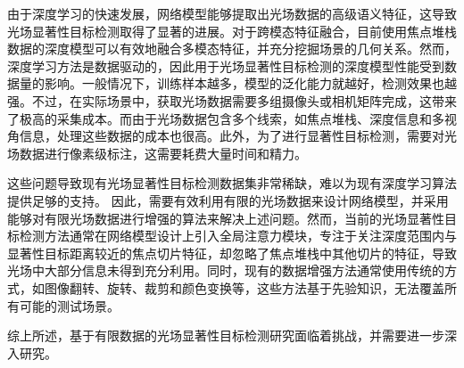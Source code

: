 
由于深度学习的快速发展，网络模型能够提取出光场数据的高级语义特征，这导致光场显著性目标检测取得了显著的进展。对于跨模态特征融合，目前使用焦点堆栈数据的深度模型可以有效地融合多模态特征，并充分挖掘场景的几何关系。然而，深度学习方法是数据驱动的，因此用于光场显著性目标检测的深度模型性能受到数据量的影响。一般情况下，训练样本越多，模型的泛化能力就越好，检测效果也越强。不过，在实际场景中，获取光场数据需要多组摄像头或相机矩阵完成，这带来了极高的采集成本。而由于光场数据包含多个线索，如焦点堆栈、深度信息和多视角信息，处理这些数据的成本也很高。此外，为了进行显著性目标检测，需要对光场数据进行像素级标注，这需要耗费大量时间和精力。

这些问题导致现有光场显著性目标检测数据集非常稀缺，难以为现有深度学习算法提供足够的支持。
因此，需要有效利用有限的光场数据来设计网络模型，并采用能够对有限光场数据进行增强的算法来解决上述问题。然而，当前的光场显著性目标检测方法通常在网络模型设计上引入全局注意力模块，专注于关注深度范围内与显著性目标距离较近的焦点切片特征，却忽略了焦点堆栈中其他切片的特征，导致光场中大部分信息未得到充分利用。同时，现有的数据增强方法通常使用传统的方式，如图像翻转、旋转、裁剪和颜色变换等，这些方法基于先验知识，无法覆盖所有可能的测试场景。

综上所述，基于有限数据的光场显著性目标检测研究面临着挑战，并需要进一步深入研究。





%
%



